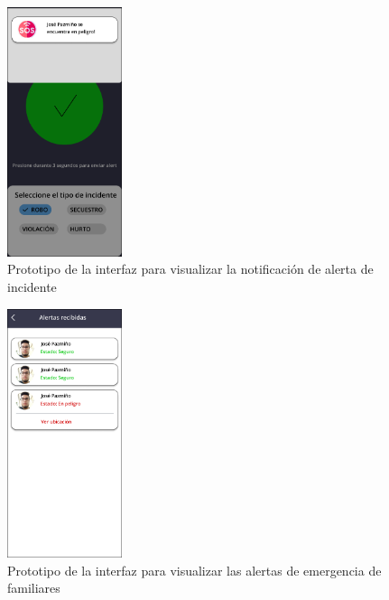 \begin{figure}[H]
      \centering
      \includegraphics[width=0.3\textwidth]{chapters/III-resultados-y-discusion/resources/images/prototipo-notificacion-alerta.png}
      \caption{Prototipo de la interfaz para visualizar la notificación de alerta de incidente}
      \label{fig:prototipo-notificacion-alerta}
\end{figure}

\begin{figure}[H]
      \centering
      \includegraphics[width=0.3\textwidth]{chapters/III-resultados-y-discusion/resources/images/prototipo-alertas-mobile.png}
      \caption{Prototipo de la interfaz para visualizar las alertas de emergencia de familiares}
      \label{fig:prototipo-alertas-mobile}
\end{figure}

